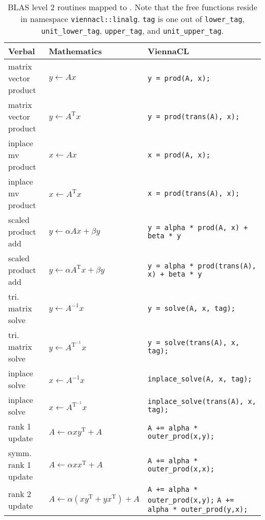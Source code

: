 \begin{table}[tb]
\begin{center}
\renewcommand{\arraystretch}{1.2}
\begin{tabular}{p{4cm}|l|p{7cm}}
Verbal & Mathematics & ViennaCL\\
\hline
matrix vector product & $y \leftarrow A x$ & \lstinline|y = prod(A, x);| \\
matrix vector product & $y \leftarrow A^\mathrm{T} x$ & \lstinline|y = prod(trans(A), x);| \\
inplace mv product & $x \leftarrow A x$ & \lstinline|x = prod(A, x);| \\
inplace mv product & $x \leftarrow A^\mathrm{T} x$ & \lstinline|x = prod(trans(A), x);| \\
\hline
scaled product add & $y \leftarrow \alpha A x + \beta y$ & \lstinline|y = alpha * prod(A, x) + beta * y| \\
scaled product add & $y \leftarrow \alpha A^{\mathrm T} x + \beta y$ & \lstinline|y = alpha * prod(trans(A), x) + beta * y| \\
\hline
tri. matrix solve & $y \leftarrow A^{-1} x$ & \lstinline|y = solve(A, x, tag);| \\
tri. matrix solve & $y \leftarrow A^\mathrm{T^{-1}} x$ & \lstinline|y = solve(trans(A), x, tag);| \\
inplace solve & $x \leftarrow A^{-1} x$ & \lstinline|inplace_solve(A, x, tag);| \\
inplace solve & $x \leftarrow A^\mathrm{T^{-1}} x$ & \lstinline|inplace_solve(trans(A), x, tag);| \\
\hline
rank 1 update & $A \leftarrow \alpha x y^{\mathrm T} + A$ & \lstinline|A += alpha * outer_prod(x,y);| \\
symm. rank 1 update & $A \leftarrow \alpha x x^{\mathrm T} + A$ & \lstinline|A += alpha * outer_prod(x,x);| \\
rank 2 update & $A \leftarrow \alpha (x y^{\mathrm T} + y x^{\mathrm T}) + A$ & \lstinline|A += alpha * outer_prod(x,y);| \lstinline|A += alpha * outer_prod(y,x);| \\
\end{tabular}
\caption{BLAS level 2 routines mapped to \ViennaCL. Note that the free functions reside in namespace \texttt{viennacl::linalg}. \lstinline|tag| is one out of \lstinline|lower_tag|, \lstinline|unit_lower_tag|, \lstinline|upper_tag|, and \lstinline|unit_upper_tag|.}
\label{tab:blas-level-2}
\end{center}
\end{table}

